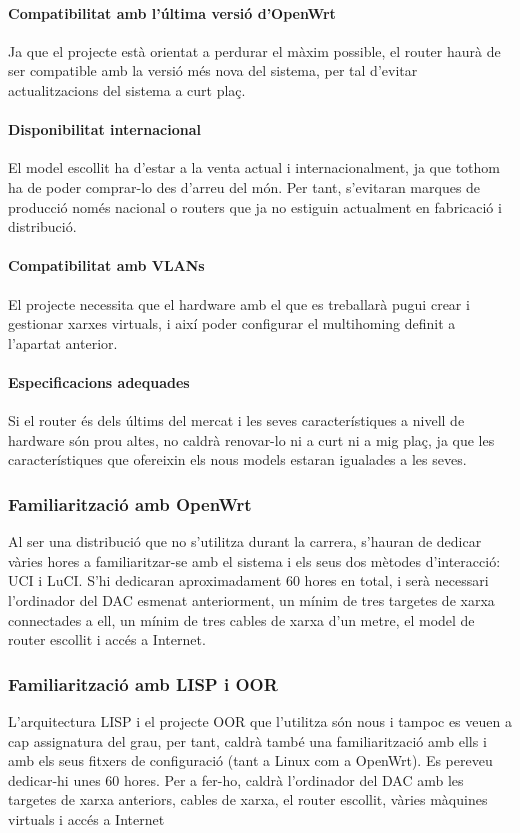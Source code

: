 \documentclass[11pt]{article}
\begin{document}
\paragraph{Compatibilitat amb l'última versió d’OpenWrt}
Ja que el projecte està orientat a perdurar el màxim possible, el router haurà de ser compatible amb la versió més nova del sistema, per tal d'evitar actualitzacions del sistema a curt plaç.
\paragraph{Disponibilitat internacional}
El model escollit ha d’estar a la venta actual i internacionalment, ja que tothom ha de poder comprar-lo des d’arreu del món. Per tant, s’evitaran marques de producció només nacional o routers que ja no estiguin actualment en fabricació i distribució.
\paragraph{Compatibilitat amb VLANs}
El projecte necessita que el hardware amb el que es treballarà pugui crear i gestionar xarxes virtuals, i així poder configurar el multihoming definit a l'apartat anterior.
\paragraph{Especificacions adequades}
Si el router és dels últims del mercat i les seves característiques a nivell de hardware són prou altes, no caldrà renovar-lo ni a curt ni a mig plaç, ja que les característiques que ofereixin els nous models estaran igualades a les seves.
\subsubsection{Familiarització amb OpenWrt}
Al ser una distribució que no s’utilitza durant la carrera, s’hauran de dedicar vàries hores a familiaritzar-se amb el sistema i els seus dos mètodes d’interacció: UCI i LuCI. S’hi dedicaran aproximadament 60 hores en total, i serà necessari l’ordinador del DAC esmenat anteriorment, un mínim de tres targetes de xarxa connectades a ell, un mínim de tres cables de xarxa d’un metre, el model de router escollit i accés a Internet.
\subsubsection{Familiarització amb LISP i OOR}
L’arquitectura LISP i el projecte OOR que l’utilitza són nous i tampoc es veuen a cap assignatura del grau, per tant, caldrà també una familiarització amb ells i amb els seus fitxers de configuració (tant a Linux com a OpenWrt). Es pereveu dedicar-hi unes 60 hores. Per a fer-ho, caldrà l’ordinador del DAC amb les targetes de xarxa anteriors, cables de xarxa, el router escollit, vàries màquines virtuals i accés a Internet
\end{document}
